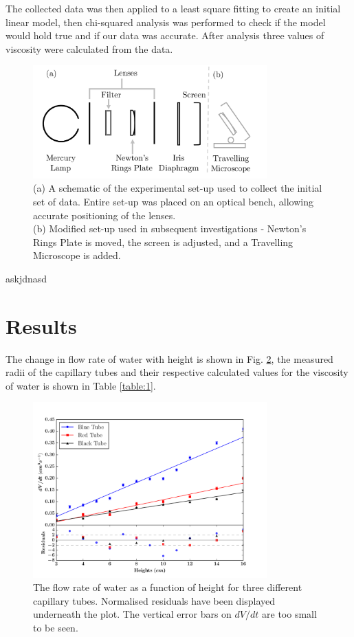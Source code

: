 \documentclass[twocolumn]{revtex4}
\begin{document}
The collected data was then applied to a least square fitting to create an initial linear model, then chi-squared analysis was performed to check if the model would hold true and if our data was accurate. After analysis three values of viscosity were calculated from the data. 

\begin{figure}[!h]
\begin{center}
\includegraphics[width=9cm]{fig1}
\caption[]{(a) A schematic of the experimental set-up used to collect the initial set of data. Entire set-up was placed on an optical bench, allowing accurate positioning of the lenses.
\\
(b) Modified set-up used in subsequent investigations - Newton's Rings Plate is moved, the screen is adjusted, and a Travelling Microscope is added.}
\label{fig:fig1}
\end{center}
\end{figure}

askjdnasd

\vspace{-3ex}
\section{Results}
\vspace{-2ex}

The change in flow rate of water with height is shown in Fig. \ref{fig:fig2}, the measured radii of the capillary tubes and their respective calculated values for the viscosity of water is shown in Table \ref{table:1}.

\vspace{-1ex}
\begin{figure}[!h]
\begin{center}
\includegraphics[width=9cm]{fig1-2}
\caption[]{The flow rate of water as a function of height for three different capillary tubes. Normalised residuals have been displayed underneath the plot. The vertical error bars on $dV/dt$ are too small to be seen.}
\label{fig:fig2}
\end{center}
\end{figure}
\end{document}
